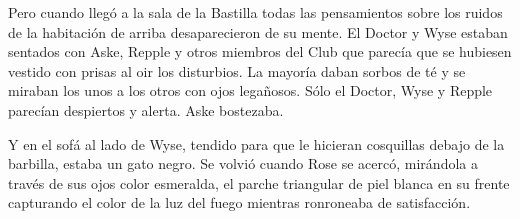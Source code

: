 {Pero cuando llegó a la sala de la Bastilla todas las pensamientos sobre
	los ruidos de la habitación de arriba desaparecieron de su mente. El
	Doctor y Wyse estaban sentados con Aske, Repple y otros miembros del
	Club que parecía que se hubiesen vestido con prisas al oir los
	disturbios. La mayoría daban sorbos de té y se miraban los unos a los
	otros con ojos legañosos. Sólo el Doctor, Wyse y Repple parecían
despiertos y alerta. Aske bostezaba.}

{Y en el sofá al lado de Wyse, tendido para que le hicieran cosquillas
	debajo de la barbilla, estaba un gato negro. Se volvió cuando Rose se
	acercó, mirándola a través de sus ojos color esmeralda, el parche
	triangular de piel blanca en su frente capturando el color de la luz del
fuego mientras ronroneaba de satisfacción.}
